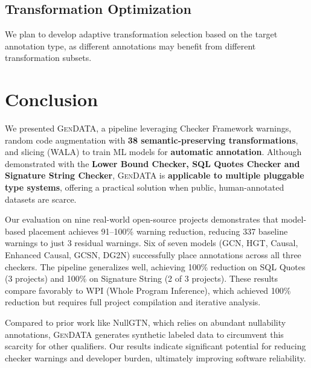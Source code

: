 \documentclass[acmsmall,screen,review,anonymous]{acmart}
\newcommand{\gendata}{\textsc{GenDATA}\xspace}
\newcommand{\cf}{Checker Framework\xspace}
\begin{document}
\subsection{Transformation Optimization}
\label{sec:transopt}

We plan to develop adaptive transformation selection based on the target annotation type, as different annotations may benefit from different transformation subsets.

\section{Conclusion}
\label{sec:conclusion}

We presented \gendata, a pipeline leveraging \cf warnings, random code augmentation with \textbf{38 semantic-preserving transformations}, and slicing (WALA) to train ML models for \textbf{automatic annotation}. Although demonstrated with the \textbf{Lower Bound Checker, SQL Quotes Checker and Signature String Checker}, \gendata is \textbf{applicable to multiple pluggable type systems}, offering a practical solution when public, human-annotated datasets are scarce.

Our evaluation on nine real-world open-source projects demonstrates that model-based placement achieves 91--100\% warning reduction, reducing 337 baseline warnings to just 3 residual warnings. Six of seven models (GCN, HGT, Causal, Enhanced Causal, GCSN, DG2N) successfully place annotations across all three checkers. The pipeline generalizes well, achieving 100\% reduction on SQL Quotes (3 projects) and 100\% on Signature String (2 of 3 projects). These results compare favorably to WPI (Whole Program Inference), which achieved 100\% reduction but requires full project compilation and iterative analysis.

Compared to prior work like NullGTN, which relies on abundant nullability annotations, \gendata generates synthetic labeled data to circumvent this scarcity for other qualifiers. Our results indicate significant potential for reducing checker warnings and developer burden, ultimately improving software reliability.

\end{document}

